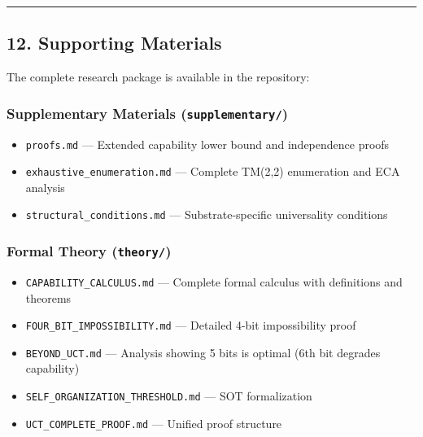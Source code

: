 \documentclass[
  11pt,
]{article}
\providecommand{\tightlist}{%
  \setlength{\itemsep}{0pt}\setlength{\parskip}{0pt}}
\begin{document}
\begin{center}\rule{0.5\linewidth}{0.5pt}\end{center}

\hypertarget{supporting-materials}{%
\subsection{12. Supporting Materials}\label{supporting-materials}}

The complete research package is available in the repository:

\hypertarget{supplementary-materials-supplementary}{%
\subsubsection{\texorpdfstring{Supplementary Materials
(\texttt{supplementary/})}{Supplementary Materials (supplementary/)}}\label{supplementary-materials-supplementary}}

\begin{itemize}
\tightlist
\item
  \texttt{proofs.md} --- Extended capability lower bound and
  independence proofs
\item
  \texttt{exhaustive\_enumeration.md} --- Complete TM(2,2) enumeration
  and ECA analysis
\item
  \texttt{structural\_conditions.md} --- Substrate-specific universality
  conditions
\end{itemize}

\hypertarget{formal-theory-theory}{%
\subsubsection{\texorpdfstring{Formal Theory
(\texttt{theory/})}{Formal Theory (theory/)}}\label{formal-theory-theory}}

\begin{itemize}
\tightlist
\item
  \texttt{CAPABILITY\_CALCULUS.md} --- Complete formal calculus with
  definitions and theorems
\item
  \texttt{FOUR\_BIT\_IMPOSSIBILITY.md} --- Detailed 4-bit impossibility
  proof
\item
  \texttt{BEYOND\_UCT.md} --- Analysis showing 5 bits is optimal (6th
  bit degrades capability)
\item
  \texttt{SELF\_ORGANIZATION\_THRESHOLD.md} --- SOT formalization
\item
  \texttt{UCT\_COMPLETE\_PROOF.md} --- Unified proof structure
\end{itemize}
\end{document}
